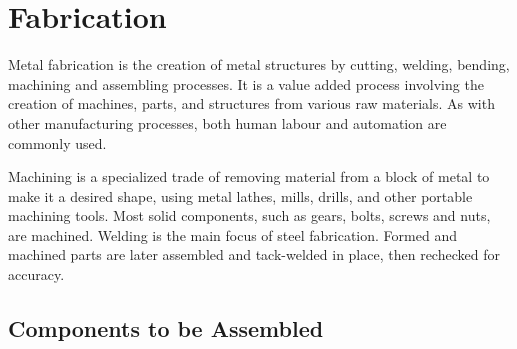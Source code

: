 \chapter{Fabrication} \label{Fabrication}

Metal fabrication is the creation of metal structures by cutting, welding, bending, machining and assembling processes. It is a value added process involving the creation of machines, parts, and structures from various raw materials. As with other manufacturing processes, both human labour and automation are commonly used.

Machining is a specialized trade of removing material from a block of metal to make it a desired shape, using metal lathes, mills, drills, and other portable machining tools. Most solid components, such as gears, bolts, screws and nuts, are machined. Welding is the main focus of steel fabrication. Formed and machined parts are later assembled and tack-welded in place, then rechecked for accuracy.


\section{Components to be Assembled} \label{Components to be Assembled}

